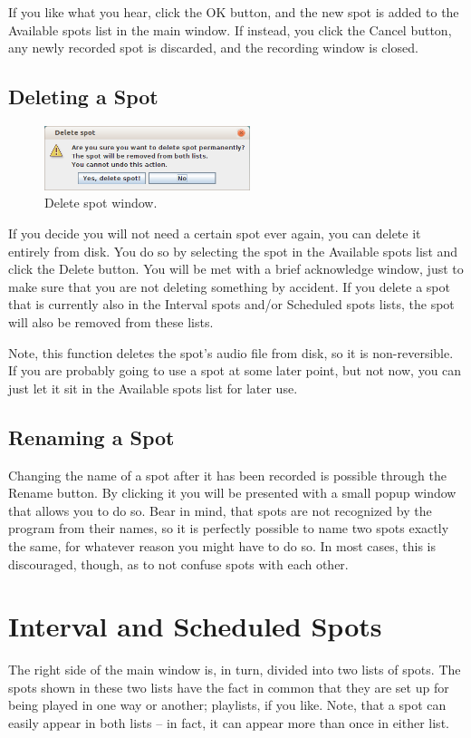 \documentclass[a4paper,12pt]{report}
\begin{document}
If you like what you hear, click the OK button, and the new spot is added to the
Available spots list in the main window. If instead, you click the Cancel
button, any newly recorded spot is discarded, and the recording window is
closed.

\subsection{Deleting a Spot}

\begin{figure}[h]
\centering \includegraphics[width=60mm]{deletespotdialogue.png}
\caption{Delete spot window.}
\end{figure}

If you decide you will not need a certain spot ever again, you can delete it
entirely from disk. You do so by selecting the spot in the Available spots list
and click the Delete button. You will be met with a brief acknowledge window,
just to make sure that you are not deleting something by accident. If you delete
a spot that is currently also in the Interval spots and/or Scheduled spots
lists, the spot will also be removed from these lists.

Note, this function deletes the spot's audio file from disk, so it is
non-reversible. If you are probably going to use a spot at some later point, but
not now, you can just let it sit in the Available spots list for later use.

\subsection{Renaming a Spot}
Changing the name of a spot after it has been recorded is possible through the
Rename button. By clicking it you will be presented with a small popup window
that allows you to do so. Bear in mind, that spots are not recognized by the
program from their names, so it is perfectly possible to name two spots exactly
the same, for whatever reason you might have to do so. In most cases, this is
discouraged, though, as to not confuse spots with each other.

\section{Interval and Scheduled Spots}
The right side of the main window is, in turn, divided into two lists of spots.
The spots shown in these two lists have the fact in common that they are set up
for being played in one way or another; playlists, if you like. Note, that a
spot can easily appear in both lists -- in fact, it can appear more than once in
either list.
\end{document}
